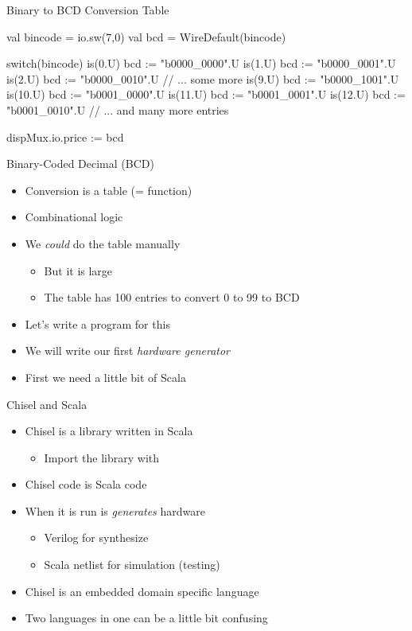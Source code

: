 \begin{frame}[fragile]{Binary to BCD Conversion Table}
\begin{chisel}
  val bincode = io.sw(7,0)
  val bcd = WireDefault(bincode)

  switch(bincode) {
    is(0.U) { bcd := "b0000_0000".U }
    is(1.U) { bcd := "b0000_0001".U }
    is(2.U) { bcd := "b0000_0010".U }
    // ... some more
    is(9.U) { bcd := "b0000_1001".U }
    is(10.U) { bcd := "b0001_0000".U }
    is(11.U) { bcd := "b0001_0001".U }
    is(12.U) { bcd := "b0001_0010".U }
    // ... and many more entries
  }

  dispMux.io.price := bcd
\end{chisel}
\end{frame}

\begin{frame}[fragile]{Binary-Coded Decimal (BCD)}
\begin{itemize}
\item Conversion is a table (= function)
\item Combinational logic
\item We \emph{could} do the table manually
\begin{itemize}
\item But it is large
\item The table has 100 entries to convert 0 to 99 to BCD
\end{itemize}
\item Let's write a program for this
\item We will write our first \emph{hardware generator}
\item First we need a little bit of Scala
\end{itemize}
\end{frame}



\begin{frame}[fragile]{Chisel and Scala}
\begin{itemize}
\item Chisel is a library written in Scala
\begin{itemize}
\item Import the library with 
\end{itemize}
\item Chisel code is Scala code
\item When it is run is \emph{generates} hardware
\begin{itemize}
\item Verilog for synthesize
\item Scala netlist for simulation (testing)
\end{itemize}
\item Chisel is an embedded domain specific language
\item Two languages in one can be a little bit confusing
\end{itemize}
\end{frame}

